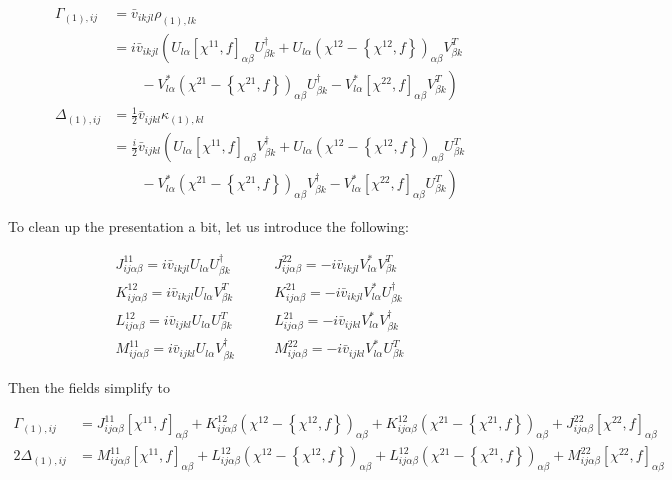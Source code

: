\begin{align*}
\Gamma_{(1),ij} 
&= \bar{v}_{ikjl}\rho_{(1),lk} \\
&= i\bar{v}_{ikjl}\left(U_{l\alpha}[\chi^{11},f]_{\alpha\beta}U^\dagger_{\beta k} + U_{l\alpha}\left(\chi^{12}-\left\{\chi^{12},f\right\}\right)_{\alpha\beta}V^T_{\beta k}\right. \\
&\left.\qquad - V^*_{l\alpha}\left(\chi^{21}-\left\{\chi^{21},f\right\}\right)_{\alpha\beta}U^\dagger_{\beta k} - V^*_{l\alpha}[\chi^{22},f]_{\alpha\beta}V^T_{\beta k} \right) \\
\Delta_{(1),ij} 
&= \frac{1}{2}\bar{v}_{ijkl}\kappa_{(1),kl} \\
&= \frac{i}{2}\bar{v}_{ijkl}\left(U_{l\alpha}[\chi^{11},f]_{\alpha\beta}V^\dagger_{\beta k} + U_{l\alpha}\left(\chi^{12}-\left\{\chi^{12},f\right\}\right)_{\alpha\beta}U^T_{\beta k}\right. \\
&\left.\qquad - V^*_{l\alpha}\left(\chi^{21}-\left\{\chi^{21},f\right\}\right)_{\alpha\beta}V^\dagger_{\beta k} - V^*_{l\alpha}[\chi^{22},f]_{\alpha\beta}U^T_{\beta k} \right)
\end{align*}

To clean up the presentation a bit, let us introduce the following:

\begin{tcolorbox}
\begin{align*}
J^{11}_{ij\alpha\beta} = i\bar{v}_{ikjl}U_{l\alpha}U^\dagger_{\beta k} &\qquad J^{22}_{ij\alpha\beta} = -i\bar{v}_{ikjl}V^*_{l\alpha}V^T_{\beta k} \\
K^{12}_{ij\alpha\beta} = i\bar{v}_{ikjl}U_{l\alpha}V^T_{\beta k} &\qquad K^{21}_{ij\alpha\beta} = -i\bar{v}_{ikjl}V^*_{l\alpha}U^\dagger_{\beta k} \\
L^{12}_{ij\alpha\beta} = i\bar{v}_{ijkl}U_{l\alpha}U^T_{\beta k} &\qquad L^{21}_{ij\alpha\beta} = -i\bar{v}_{ijkl}V^*_{l\alpha}V^\dagger_{\beta k} \\
M^{11}_{ij\alpha\beta} = i\bar{v}_{ijkl}U_{l\alpha}V^\dagger_{\beta k} &\qquad M^{22}_{ij\alpha\beta} = -i\bar{v}_{ijkl}V^*_{l\alpha}U^T_{\beta k}
\end{align*}
\end{tcolorbox}

\noindent Then the fields simplify to

\begin{align*}
\Gamma_{(1),ij} &= J^{11}_{ij\alpha\beta}[\chi^{11},f]_{\alpha\beta} + K^{12}_{ij\alpha\beta}\left(\chi^{12}-\left\{\chi^{12},f\right\}\right)_{\alpha\beta} + K^{12}_{ij\alpha\beta}\left(\chi^{21}-\left\{\chi^{21},f\right\}\right)_{\alpha\beta} + J^{22}_{ij\alpha\beta}[\chi^{22},f]_{\alpha\beta} \\
2\Delta_{(1),ij}  &= M^{11}_{ij\alpha\beta}[\chi^{11},f]_{\alpha\beta} + L^{12}_{ij\alpha\beta}\left(\chi^{12}-\left\{\chi^{12},f\right\}\right)_{\alpha\beta} + L^{12}_{ij\alpha\beta}\left(\chi^{21}-\left\{\chi^{21},f\right\}\right)_{\alpha\beta} + M^{22}_{ij\alpha\beta}[\chi^{22},f]_{\alpha\beta} \\
\end{align*}


